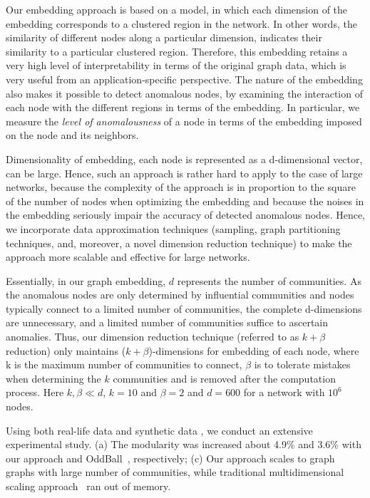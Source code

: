 Our embedding approach is  based on a model, in which each dimension of the embedding corresponds to a clustered region in the network.
In other words, the similarity of different nodes along a particular dimension, indicates their similarity to a particular clustered region.
Therefore, this embedding retains a very high level of interpretability in  terms of the original graph data, which is very useful from an application-specific perspective. The nature of  the embedding also  makes it  possible  to detect anomalous nodes, by examining the interaction of each node with the different regions in terms of the embedding. In particular, we measure the {\em level of anomalousness} of a node in terms of the embedding imposed on the node and its neighbors.


Dimensionality of embedding, each node is represented as a d-dimensional vector, can be large. Hence, such an approach is rather hard to apply to the case of large networks, because the complexity of the approach is in proportion to the square of the number of nodes when optimizing the embedding and because the noises in the embedding seriously impair the accuracy of detected anomalous nodes. Hence, we incorporate data approximation techniques (sampling, graph partitioning techniques, and, moreover, a novel dimension reduction technique) to make the approach more scalable and effective for large networks.

Essentially, in our graph embedding, $d$ represents the number of communities. As the anomalous nodes are only determined by influential communities and nodes typically connect to a limited number of communities, the complete d-dimensions are unnecessary, and a limited number of communities suffice to ascertain anomalies. Thus, our dimension reduction technique (referred to as $k+\beta$ reduction) only maintains ($k + \beta$)-dimensions for embedding of each node, where k is the maximum number of communities to connect, $\beta$ is to tolerate mistakes when determining the $k$ communities and is removed after the computation process. Here $k, \beta \ll d$, \eg $k = 10$ and $\beta = 2$ and $d=600$ for a network with $10^6$ nodes.



Using both real-life data and synthetic
data , we conduct an extensive experimental study.
 (a) The modularity \cite{newman1} was increased about 4.9\% and 3.6\% with our approach and OddBall~\cite{akoglu14}, respectively; (c) Our approach scales to graph graphs with large number of communities, while traditional  multidimensional scaling approach~\cite{mds} ran out of memory.

